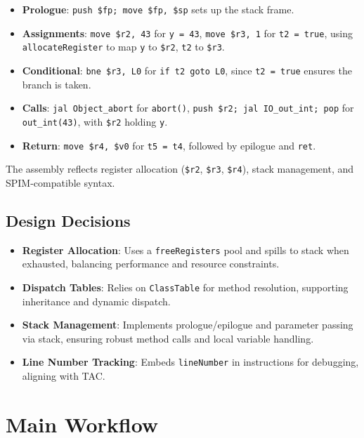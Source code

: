 \documentclass[11pt, titlepage]{article}
\begin{document}
\begin{itemize}[leftmargin=*]
    \item \textbf{Prologue}: \texttt{push \$fp; move \$fp, \$sp} sets up the stack frame.
    \item \textbf{Assignments}: \texttt{move \$r2, 43} for \texttt{y = 43}, \texttt{move \$r3, 1} for \texttt{t2 = true}, using \texttt{allocateRegister} to map \texttt{y} to \texttt{\$r2}, \texttt{t2} to \texttt{\$r3}.
    \item \textbf{Conditional}: \texttt{bne \$r3, L0} for \texttt{if t2 goto L0}, since \texttt{t2 = true} ensures the branch is taken.
    \item \textbf{Calls}: \texttt{jal Object\_abort} for \texttt{abort()}, \texttt{push \$r2; jal IO\_out\_int; pop} for \texttt{out\_int(43)}, with \texttt{\$r2} holding \texttt{y}.
    \item \textbf{Return}: \texttt{move \$r4, \$v0} for \texttt{t5 = t4}, followed by epilogue and \texttt{ret}.
\end{itemize}

The assembly reflects register allocation (\texttt{\$r2}, \texttt{\$r3}, \texttt{\$r4}), stack management, and SPIM-compatible syntax.

\subsection{Design Decisions}
\begin{itemize}[leftmargin=*]
    \item \textbf{Register Allocation}: Uses a \texttt{freeRegisters} pool and spills to stack when exhausted, balancing performance and resource constraints.
    \item \textbf{Dispatch Tables}: Relies on \texttt{ClassTable} for method resolution, supporting inheritance and dynamic dispatch.
    \item \textbf{Stack Management}: Implements prologue/epilogue and parameter passing via stack, ensuring robust method calls and local variable handling.
    \item \textbf{Line Number Tracking}: Embeds \texttt{lineNumber} in instructions for debugging, aligning with TAC.
\end{itemize}

\section{Main Workflow}
\label{sec:workflow}
\end{document}
